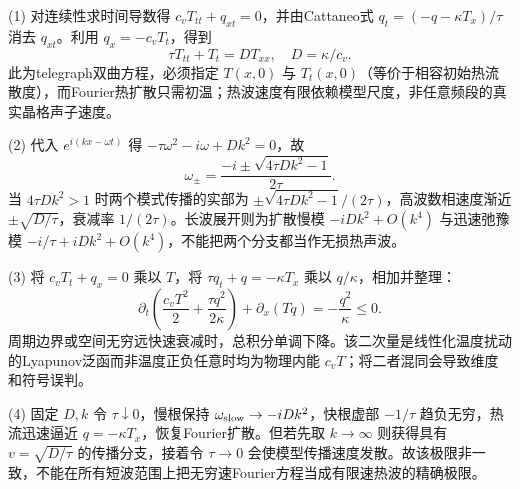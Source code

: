 (1) 对连续性求时间导数得 \(c_vT_{tt}+q_{xt}=0\)，并由Cattaneo式 \(q_t=(-q-\kappa T_x)/\tau\) 消去 \(q_{xt}\)。利用 \(q_x=-c_vT_t\)，得到
\[
\boxed{\tau T_{tt}+T_t=D T_{xx}},\quad D=\kappa/c_v.
\]
此为telegraph双曲方程，必须指定 \(T(x,0)\) 与 \(T_t(x,0)\)（等价于相容初始热流散度），而Fourier热扩散只需初温；热波速度有限依赖模型尺度，非任意频段的真实晶格声子速度。

(2) 代入 \(e^{i(kx-\omega t)}\) 得 \(-\tau\omega^2-i\omega+Dk^2=0\)，故
\[
\omega_\pm=\frac{-i\pm\sqrt{4\tau Dk^2-1}}{2\tau}.
\]
当 \(4\tau Dk^2>1\) 时两个模式传播的实部为 \(\pm\sqrt{4\tau Dk^2-1}/(2\tau)\)，高波数相速度渐近 \(\pm\sqrt{D/\tau}\)，衰减率 \(1/(2\tau)\)。长波展开则为扩散慢模 \(-iDk^2+O(k^4)\) 与迅速弛豫模 \(-i/\tau+iDk^2+O(k^4)\)，不能把两个分支都当作无损热声波。

(3) 将 \(c_vT_t+q_x=0\) 乘以 \(T\)，将 \(\tau q_t+q=-\kappa T_x\) 乘以 \(q/\kappa\)，相加并整理：
\[
\boxed{\partial_t\left(\frac{c_vT^2}{2}+\frac{\tau q^2}{2\kappa}\right)
+\partial_x(Tq)=-\frac{q^2}{\kappa}\le0}.
\]
周期边界或空间无穷远快速衰减时，总积分单调下降。该二次量是线性化温度扰动的Lyapunov泛函而非温度正负任意时均为物理内能 \(c_vT\)；将二者混同会导致维度和符号误判。

(4) 固定 \(D,k\) 令 \(\tau\downarrow0\)，慢根保持 \(\omega_{\rm slow}\to-iDk^2\)，快根虚部 \(-1/\tau\) 趋负无穷，热流迅速逼近 \(q=-\kappa T_x\)，恢复Fourier扩散。但若先取 \(k\to\infty\) 则获得具有 \(v=\sqrt{D/\tau}\) 的传播分支，接着令 \(\tau\to0\) 会使模型传播速度发散。故该极限非一致，不能在所有短波范围上把无穷速Fourier方程当成有限速热波的精确极限。
